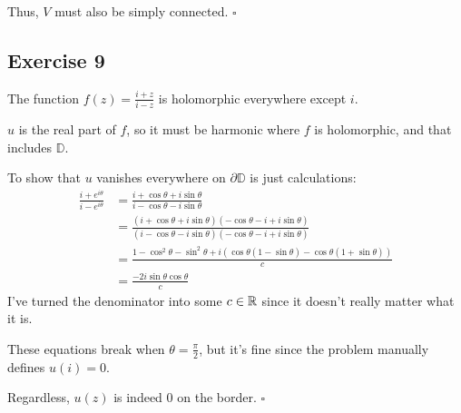 \documentclass[12pt]{article}
\begin{document}
Thus, $V$ must also be simply connected. $\square$

\subsection{Exercise 9}

The function $f(z)=\frac{i+z}{i-z}$ is holomorphic everywhere except $i$.

$u$ is the real part of $f$, so it must be harmonic where $f$ is holomorphic,
and that includes $\mathbb{D}$.

To show that $u$ vanishes everywhere on $\partial \mathbb{D}$ is just calculations:
\begin{align*}
  \frac{i+e^{i\theta}}{i-e^{i\theta}}
  &= \frac{i+\cos\theta+i\sin\theta}{i-\cos\theta-i\sin\theta} \\
  &= \frac{(i+\cos\theta+i\sin\theta)(-\cos\theta-i+i\sin\theta)}{(i-\cos\theta-i\sin\theta)(-\cos\theta-i+i\sin\theta)} \\
  &= \frac{1-\cos^2\theta-\sin^2\theta+i(\cos\theta(1-\sin\theta)-\cos\theta(1+\sin\theta))}{c} \\
  &= \frac{-2i\sin\theta\cos\theta}{c}
\end{align*}
I've turned the denominator into some $c \in \mathbb{R}$ since it doesn't really matter what it is.

These equations break when $\theta=\frac{\pi}{2}$, but it's fine
since the problem manually defines $u(i)=0$.

Regardless, $u(z)$ is indeed $0$ on the border. $\square$
\end{document}
